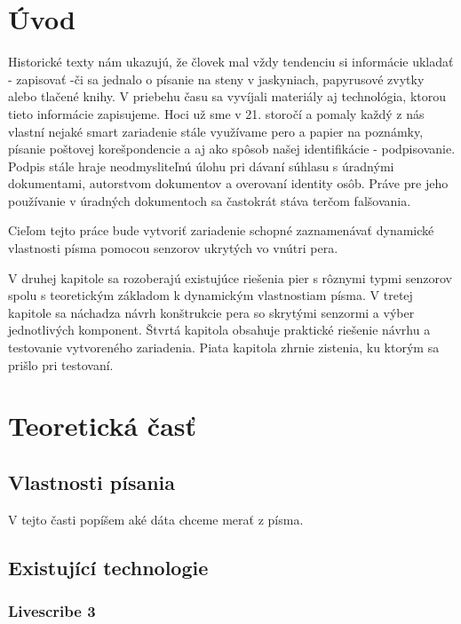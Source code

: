 \chapter{Úvod}

Historické texty nám ukazujú, že človek mal vždy tendenciu si informácie ukladať - zapisovať -či sa jednalo o písanie na steny v jaskyniach, papyrusové zvytky alebo tlačené knihy. V priebehu času sa vyvíjali materiály aj technológia, ktorou tieto informácie zapisujeme. Hoci už sme v 21. storočí a pomaly každý z nás vlastní nejaké smart zariadenie stále využívame pero a papier na poznámky, písanie poštovej korešpondencie a aj ako spôsob našej identifikácie - podpisovanie. Podpis stále hraje neodmysliteľnú úlohu pri dávaní súhlasu s úradnými dokumentami, autorstvom dokumentov a overovaní identity osôb. Práve pre jeho používanie v úradných dokumentoch sa častokrát stáva terčom falšovania.

Cieľom tejto práce bude vytvoriť zariadenie schopné zaznamenávať dynamické vlastnosti písma pomocou senzorov ukrytých vo vnútri pera. 

V druhej kapitole sa rozoberajú existujúce riešenia pier s rôznymi typmi senzorov spolu s teoretickým základom k dynamickým vlastnostiam písma. V tretej kapitole sa náchadza návrh konštrukcie pera so skrytými senzormi a výber jednotlivých komponent. Štvrtá kapitola obsahuje praktické riešenie návrhu a testovanie vytvoreného zariadenia. Piata kapitola zhrnie zistenia, ku ktorým sa prišlo pri testovaní.

\chapter{Teoretická časť}

\section{Vlastnosti písania}

V tejto časti popíšem aké dáta chceme merať z písma.

\section{Existující technologie}

\subsection*{Livescribe 3}

